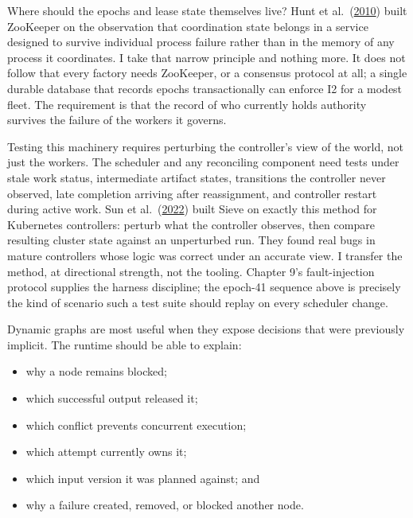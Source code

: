 Where should the epochs and lease state themselves live? Hunt et al.~(\href{https://www.usenix.org/conference/usenix-atc-10/zookeeper-wait-free-coordination-internet-scale-systems}{2010}) built ZooKeeper on the observation that coordination state belongs in a service designed to survive individual process failure rather than in the memory of any process it coordinates. I take that narrow principle and nothing more. It does not follow that every factory needs ZooKeeper, or a consensus protocol at all; a single durable database that records epochs transactionally can enforce I2 for a modest fleet. The requirement is that the record of who currently holds authority survives the failure of the workers it governs.

Testing this machinery requires perturbing the controller's view of the world, not just the workers. The scheduler and any reconciling component need tests under stale work status, intermediate artifact states, transitions the controller never observed, late completion arriving after reassignment, and controller restart during active work. Sun et al.~(\href{https://www.usenix.org/system/files/osdi22-sun.pdf}{2022}) built Sieve on exactly this method for Kubernetes controllers: perturb what the controller observes, then compare resulting cluster state against an unperturbed run. They found real bugs in mature controllers whose logic was correct under an accurate view. I transfer the method, at directional strength, not the tooling. Chapter 9's fault-injection protocol supplies the harness discipline; the epoch-41 sequence above is precisely the kind of scenario such a test suite should replay on every scheduler change.


Dynamic graphs are most useful when they expose decisions that were previously implicit. The runtime should be able to explain:

\begin{itemize}
\tightlist
\item
  why a node remains blocked;
\item
  which successful output released it;
\item
  which conflict prevents concurrent execution;
\item
  which attempt currently owns it;
\item
  which input version it was planned against; and
\item
  why a failure created, removed, or blocked another node.
\end{itemize}

